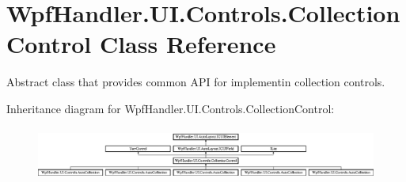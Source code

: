 \hypertarget{class_wpf_handler_1_1_u_i_1_1_controls_1_1_collection_control}{}\section{Wpf\+Handler.\+U\+I.\+Controls.\+Collection\+Control Class Reference}
\label{class_wpf_handler_1_1_u_i_1_1_controls_1_1_collection_control}


Abstract class that provides common A\+PI for implementin collection controls.  


Inheritance diagram for Wpf\+Handler.\+U\+I.\+Controls.\+Collection\+Control\+:\begin{figure}[H]
\begin{center}
\leavevmode
\includegraphics[height=1.763780cm]{d5/d8b/class_wpf_handler_1_1_u_i_1_1_controls_1_1_collection_control}
\end{center}
\end{figure}
